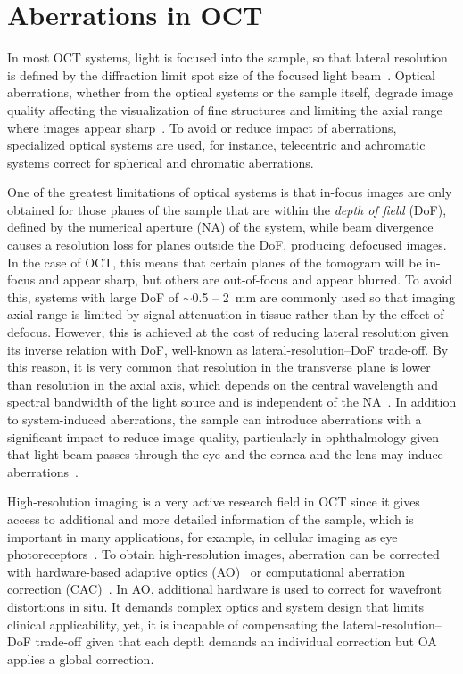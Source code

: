\section{Aberrations in OCT}

In most OCT systems, light is focused into the sample, so that lateral resolution is defined by the diffraction limit spot size of the focused light beam~\cite{}. Optical aberrations, whether from the optical systems or the sample itself, degrade image quality affecting the visualization of fine structures and limiting the axial range where images appear sharp~\cite{}. To avoid or reduce impact of aberrations, specialized optical systems are used, for instance, telecentric and achromatic systems correct for spherical and chromatic aberrations.

One of the greatest limitations of optical systems is that in-focus images are only obtained for those planes of the sample that are within the \textit{depth of field} (DoF), defined by the numerical aperture (NA) of the system, while beam divergence causes a resolution loss for planes outside the DoF, producing defocused images. In the case of OCT, this means that certain planes of the tomogram will be in-focus and appear sharp, but others are out-of-focus and appear blurred. To avoid this, systems with large DoF of $\sim$0.5 -- 2~mm are commonly used so that imaging axial range is limited by signal attenuation in tissue rather than by the effect of defocus. However, this is achieved at the cost of reducing lateral resolution given its inverse relation with DoF, well-known as lateral-resolution--DoF trade-off. By this reason, it is very common that resolution in the transverse plane is lower than resolution in the axial axis, which depends on the central wavelength and spectral bandwidth of the light source and is independent of the NA~\cite{}. In addition to system-induced aberrations, the sample can introduce aberrations with a significant impact to reduce image quality, particularly in ophthalmology given that light beam passes through the eye and the cornea and the lens may induce aberrations~\cite{}. 

High-resolution imaging is a very active research field in OCT since it gives access to additional and more detailed information of the sample, which is important in many applications, for example, in cellular imaging as eye photoreceptors~\cite{}. To obtain high-resolution images, aberration can be corrected with hardware-based adaptive optics (AO)~\cite{} or computational aberration correction (CAC)~\cite{}. In AO, additional hardware is used to correct for wavefront distortions in situ. It demands complex optics and system design that limits clinical applicability, yet, it is incapable of compensating the lateral-resolution--DoF trade-off given that each depth demands an individual correction but OA applies a global correction.

